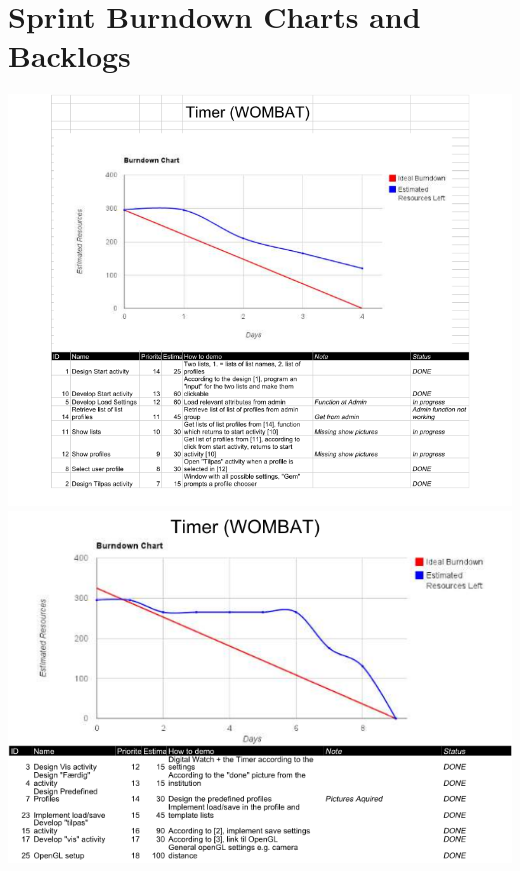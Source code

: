 \section{Sprint Burndown Charts and Backlogs}
\label{sec:burn_back}
	\begin{center}
		\includegraphics[width=\textwidth]{Development/burndown_charts/Sprint_1.png}
		\includegraphics[width=\textwidth]{Development/burndown_charts/Sprint_2.png}

\end{center}

